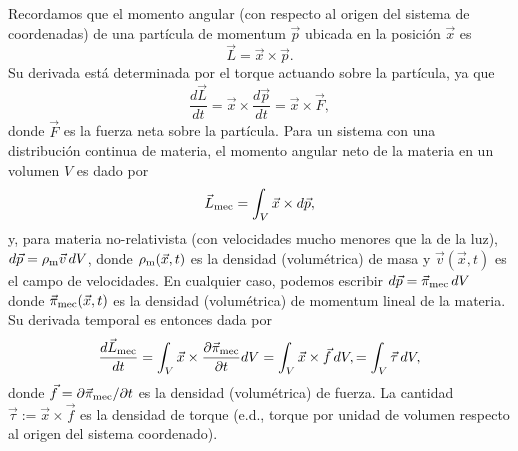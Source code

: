 Recordamos que el momento angular (con respecto al origen del sistema de coordenadas) de una partícula de momentum $\vec{p}$ ubicada en la posición $\vec{x}$ es
\begin{equation}
\vec{L}=\vec{x}\times \vec{p}.
\end{equation}
Su derivada está determinada por el torque actuando sobre la partícula, ya que
\begin{equation}
\frac{d\vec{L}}{dt}=\vec{x}\times \frac{d\vec{p}}{dt}=\vec{x}\times \vec{F},
\end{equation}
donde $\vec{F}$ es la fuerza neta sobre la partícula. Para un sistema con una distribución continua de materia, el momento angular neto de la materia en un volumen $V$ es dado por 
\begin{equation}
\vec{L}_{\rm mec}=\int_V\vec{x}\times d\vec{p},
\end{equation}
y, para materia no-relativista (con velocidades mucho menores que la de la luz), $d\vec{p}=\rho_{\rm m}\vec{v}\,dV$, donde $\rho_{\rm m}(\vec{x},t)$ es la densidad (volumétrica) de masa y $\vec{v}(\vec{x},t)$ es el campo de velocidades. En cualquier caso, podemos escribir $d\vec{p}=\vec{\pi}_{\rm mec}\,dV$ donde $\vec{\pi}_{\rm mec}(\vec{x},t)$ es la densidad (volumétrica) de momentum lineal de la materia. Su derivada temporal es entonces dada por
\begin{equation}
\frac{d\vec{L}_{\rm mec}}{dt} = \int_V\vec{x}\times \frac{\partial\vec{\pi}_{\rm mec}}{\partial t}dV = \int_V\vec{x}\times \vec{f}\,dV, = \int_V\vec{\tau}\,dV,
\end{equation}
donde $ \vec{f}=\partial\vec{\pi}_{\rm mec}/{\partial t}$ es la densidad (volumétrica) de fuerza. La cantidad $\vec{\tau} := \vec{x}\times \vec{f}$ es la densidad de torque (e.d., torque por unidad de volumen respecto al origen del sistema coordenado).

